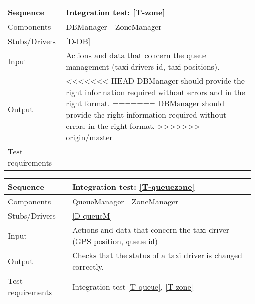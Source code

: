 \begin{table}[H]
    \begin{tabularx}{\textwidth}{l|X}
        \hline
        Sequence
        & 
        Integration test: \ref{T-zone}
        \\ \hline
        Components 
        & 
        DBManager - ZoneManager
        \\ \hline
        Stubs/Drivers 
        & 
        \ref{D-DB}
        \\ \hline
        Input 
        & 
        Actions and data that concern the queue management (taxi drivers id, taxi positions).
        \\ \hline
        Output 
        & 
<<<<<<< HEAD
        DBManager should provide the right information required without errors and in the right format.
=======
        DBManager should provide the right information required without errors in the right format.
>>>>>>> origin/master
        \\ \hline
        Test requirements 
        & 
        
        \\ \hline
    \end{tabularx}
\end{table}

\begin{table}[H]
    \begin{tabularx}{\textwidth}{l|X}
        \hline
        Sequence
        & 
        Integration test: \ref{T-queuezone}
        \\ \hline
        Components 
        & 
        QueueManager - ZoneManager
        \\ \hline
        Stubs/Drivers 
        & 
        \ref{D-queueM}
        \\ \hline
        Input 
        & 
        Actions and data that concern the taxi driver (GPS position, queue id)
        \\ \hline
        Output 
        & 
        Checks that the status of a taxi driver is changed correctly.
        \\ \hline
        Test requirements 
        & 
        Integration test \ref{T-queue}, \ref{T-zone}
        \\ \hline
    \end{tabularx}
\end{table}


